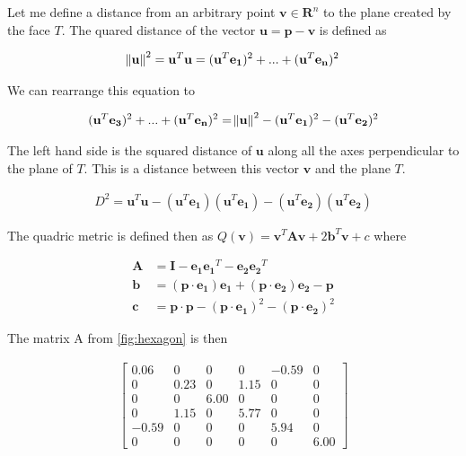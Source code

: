 Let me define a distance from an arbitrary point $\mathbf{v}\in\mathbf{R}^n$ to the plane created by the face $T$. The quared distance of the vector $\mathbf{u} = \mathbf{p} - \mathbf{v}$ is defined as \cite{garland99}

\begin{align}
\norm{\mathbf{u}}^2 = \mathbf{u}^T\mathbf{u} = (\mathbf{u}^T\mathbf{e_1})^2 + ... +  (\mathbf{u}^T\mathbf{e_n})^2
\end{align}

We can rearrange this equation to

\begin{align}
(\mathbf{u}^T\mathbf{e_3})^2 + ... +  (\mathbf{u}^T\mathbf{e_n})^2 = \norm{\mathbf{u}}^2 - (\mathbf{u}^T\mathbf{e_1})^2 - (\mathbf{u}^T\mathbf{e_2})^2
\end{align}

The left hand side is the squared distance of $\mathbf{u}$ along all the axes perpendicular to the plane of $T$. This is a distance between this vector $\mathbf{v}$ and the plane $T$.

\begin{align}
D^2 = \mathbf{u}^T\mathbf{u} - (\mathbf{u}^T\mathbf{e_1})(\mathbf{u}^T\mathbf{e_1}) - (\mathbf{u}^T\mathbf{e_2})(\mathbf{u}^T\mathbf{e_2})
\end{align}

The quadric metric is defined then as $Q(\mathbf{v}) = \mathbf{v}^T\mathbf{A}\mathbf{v} + 2\mathbf{b}^T\mathbf{v} + c$ where

\begin{align}
\mathbf{A} &= \mathbf{I} - \mathbf{e_1}\mathbf{e_1}^T - \mathbf{e_2}\mathbf{e_2}^T\\
\mathbf{b} &= (\mathbf{p} \cdot \mathbf{e_1})\mathbf{e_1} + (\mathbf{p} \cdot \mathbf{e_2})\mathbf{e_2} - \mathbf{p}\\ 
\mathbf{c} &= \mathbf{p} \cdot \mathbf{p} - (\mathbf{p} \cdot \mathbf{e_1})^2 - (\mathbf{p} \cdot \mathbf{e_2})^2 
\end{align}

The matrix A from \ref{fig:hexagon} is then

\begin{align}
\left[
\begin{array}{rrrrrr}
0.06 & 0 & 0 & 0 & -0.59 & 0\\
0 & 0.23 & 0 & 1.15 & 0 & 0\\
0 & 0 & 6.00 & 0 & 0 & 0\\
0 & 1.15 & 0 & 5.77 & 0 & 0\\
-0.59 & 0 & 0 & 0 & 5.94 & 0\\
0 & 0 & 0 & 0 & 0 & 6.00
\end{array}\right]
\end{align}

